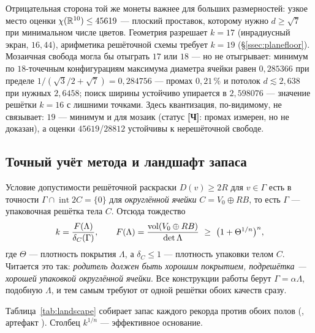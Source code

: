 Отрицательная сторона той же монеты важнее для больших размерностей: узкое
место оценки $\chi(\mathbb{R}^{10})\le45619$ --- плоский проставок, которому нужно
$d\ge\sqrt7$ при минимальном числе цветов. Геометрия разрешает $k=17$
(инрадиусный экран, $16{,}44$), арифметика решёточной схемы требует $k=19$
(\S\ref{ssec:planefloor}). Мозаичная свобода могла бы отыграть $17$ или $18$
--- но не отыгрывает: минимум по $18$-точечным конфигурациям максимума
диаметра ячейки равен $0{,}285366$ при пределе
$1/(\sqrt3/2+\sqrt7)=0{,}284756$ --- промах $0{,}21\,\%$ и потолок
$d\lesssim2{,}638$ при нужных $2{,}6458$; поиск ширины устойчиво упирается в
$2{,}598076$ --- значение решётки $k=16$ с лишними точками. Здесь квантизация,
по-видимому, не связывает: $19$ --- минимум и для мозаик (статус
\textbf{[Ч]}: промах измерен, но не доказан), а оценки $45619$/$28812$
устойчивы к нерешёточной свободе.

\subsection{Точный учёт метода и ландшафт запаса}
\label{ssec:accounting}

Условие допустимости решёточной раскраски $D(v)\ge2R$ для $v\in\Gamma$ есть в
точности $\Gamma\cap\operatorname{int}2C=\{0\}$ для \emph{округлённой ячейки}
$C=V_0\oplus RB$, то есть $\Gamma$ --- упаковочная решётка тела $C$. Отсюда
тождество
\begin{equation}\label{eq:accounting}
k=\frac{F(\Lambda)}{\delta_C(\Gamma)},\qquad
F(\Lambda)=\frac{\vol(V_0\oplus RB)}{\det\Lambda}\ \ge\ \bigl(1+\Theta^{1/n}\bigr)^n,
\end{equation}
где $\Theta$ --- плотность покрытия $\Lambda$, а $\delta_C\le1$ --- плотность
упаковки телом $C$. Читается это так: \emph{родитель должен быть хорошим
покрытием, подрешётка --- хорошей упаковкой округлённой ячейки}. Все
конструкции работы берут $\Gamma=\alpha\Lambda$, подобную $\Lambda$, и тем
самым требуют от одной решётки обоих качеств сразу.

Таблица~\ref{tab:landscape} собирает запас каждого рекорда против обоих полов
(, артефакт
). Столбец $k^{1/n}$ --- эффективное
основание.

